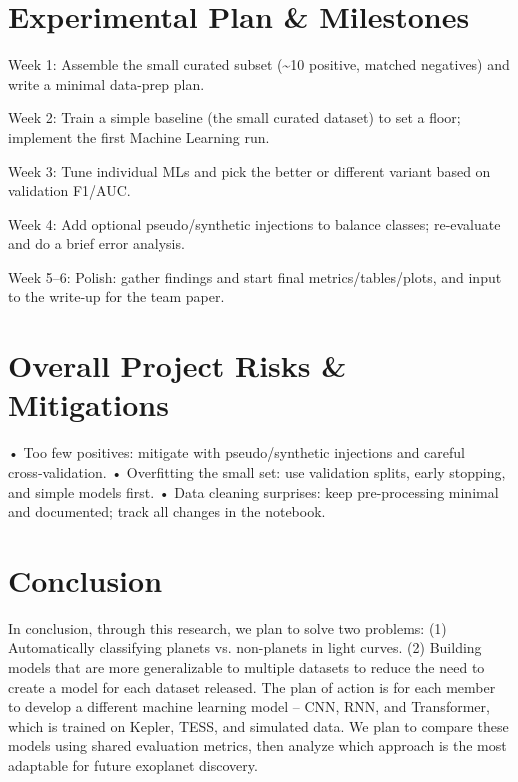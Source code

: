 \documentclass[letterpaper]{article} %
\begin{document}
\section*{Experimental Plan \& Milestones}
Week 1: Assemble the small curated subset (\textasciitilde{}10 positive, matched negatives) and write a minimal data-prep plan.

Week 2: Train a simple baseline (the small curated dataset) to set a floor; implement the first Machine Learning run.

Week 3: Tune individual MLs and pick the better or different variant based on validation F1/AUC.

Week 4: Add optional pseudo/synthetic injections to balance classes; re‑evaluate and do a brief error analysis.

Week 5–6: Polish: gather findings and start final metrics/tables/plots, and input to the write‑up for the team paper.

\section*{Overall Project Risks \& Mitigations}
• Too few positives: mitigate with pseudo/synthetic injections and careful cross‑validation.
• Overfitting the small set: use validation splits, early stopping, and simple models first.
• Data cleaning surprises: keep pre-processing minimal and documented; track all changes in the notebook.

\section*{Conclusion}
In conclusion, through this research, we plan to solve two problems: (1) Automatically classifying planets vs. non-planets in light curves. (2) Building models that are more generalizable to multiple datasets to reduce the need to create a model for each dataset released. The plan of action is for each member to develop a different machine learning model – CNN, RNN, and Transformer, which is trained on Kepler, TESS, and simulated data. We plan to compare these models using shared evaluation metrics, then analyze which approach is the most adaptable for future exoplanet discovery.


\end{document}
